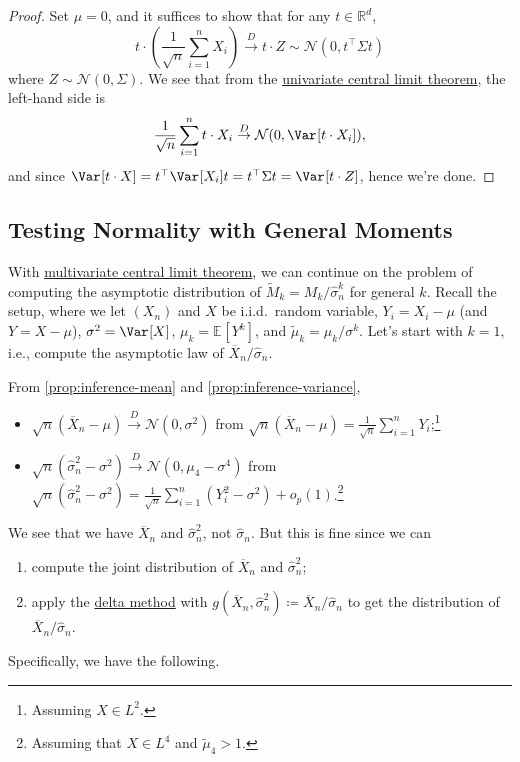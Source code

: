 \begin{proof}
	Set \(\mu = 0\), and it suffices to show that for any \(t \in \mathbb{R} ^d\),
	\[
		t \cdot \left( \frac{1}{\sqrt{n} } \sum_{i=1}^{n} X_i \right)
		\overset{D}{\to} t \cdot Z
		\sim \mathcal{N} (0, t ^{\top} \Sigma t)
	\]
	where \(Z \sim \mathcal{N} (0, \Sigma )\). We see that from the \hyperref[thm:CLT]{univariate central limit theorem}, the left-hand side is
	\[
		\frac{1}{\sqrt{n} } \sum_{i=1}^{n} t \cdot X_i
		\overset{D}{\to} \mathcal{N} (0, \Var_{}[t\cdot X_i] ),
	\]
	and since \(\Var_{}[t \cdot X] = t^{\top} \Var_{}[X_i] t = t ^{\top} \Sigma t = \Var_{}[t \cdot Z] \), hence we're done.
\end{proof}

\subsection{Testing Normality with General Moments}
With \hyperref[thm:multivariate-CLT]{multivariate central limit theorem}, we can continue on the problem of computing the asymptotic distribution of \(\widetilde{M} _k = M_k / \hat{\sigma} _n^k\) for general \(k\). Recall the setup, where we let \((X_n)\) and \(X\) be i.i.d.\ random variable, \(Y_i = X_i - \mu \) (and \(Y = X - \mu \)), \(\sigma ^2 = \Var_{}[X] \), \(\mu _k = \mathbb{E}_{}[Y^k] \), and \(\widetilde{\mu} _k = \mu _k / \sigma ^k\). Let's start with \(k = 1\), i.e., compute the asymptotic law of \(\overline{X} _n / \hat{\sigma} _n\).

\begin{prev}
	From \autoref{prop:inference-mean} and \autoref{prop:inference-variance},
	\begin{itemize}
		\item \(\sqrt{n} (\overline{X} _n - \mu ) \overset{D}{\to} \mathcal{N} (0, \sigma ^2)\) from \(\sqrt{n} (\overline{X} _n - \mu ) = \frac{1}{\sqrt{n} } \sum_{i=1}^{n} Y_i\);\footnote{Assuming \(X \in L^2\).}
		\item \(\sqrt{n} (\hat{\sigma} _n^2 - \sigma ^2) \overset{D}{\to} \mathcal{N} (0, \mu _4 - \sigma ^4) \) from \(\sqrt{n} (\hat{\sigma} _n^2 - \sigma ^2) = \frac{1}{\sqrt{n} } \sum_{i=1}^{n} (Y_i^2 - \sigma ^2) + o_p(1)\).\footnote{Assuming that \(X \in L^4\) and \(\widetilde{\mu} _4 > 1\).}
	\end{itemize}
\end{prev}

We see that we have \(\overline{X} _n\) and \(\hat{\sigma} _n^2\), not \(\hat{\sigma} _n\). But this is fine since we can
\begin{enumerate}
	\item compute the joint distribution of \(\overline{X} _n\) and \(\hat{\sigma} _n^2\);
	\item apply the \hyperref[thm:delta-method]{delta method} with \(g(\overline{X} _n , \hat{\sigma} _ n^2) \coloneqq \overline{X} _n / \hat{\sigma} _n\) to get the distribution of \(\overline{X} _n / \hat{\sigma} _n\).
\end{enumerate}
Specifically, we have the following.

